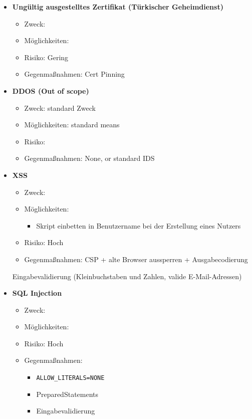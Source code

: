 \documentclass[12pt,DIV14,BCOR10mm,a4paper,twoside,parskip=half-,headsepline,headinclude,english,ngerman,bibliography=totocnumbered]{scrreprt}
\begin{document}
\begin{itemize}
  \item \textbf{Ungültig ausgestelltes Zertifikat (Türkischer Geheimdienst)}
  \begin{itemize}
  \item Zweck:
  \item Möglichkeiten:
  \item Risiko: Gering
  \item Gegenmaßnahmen: Cert Pinning
  \end{itemize}

  \item \textbf{DDOS (Out of scope)}
  \begin{itemize}
  \item Zweck: standard Zweck
  \item Möglichkeiten: standard means
  \item Risiko:
  \item Gegenmaßnahmen: None, or standard IDS
  \end{itemize}

  \item \textbf{XSS}
  \begin{itemize}
  \item Zweck:
  \item Möglichkeiten:
  \begin{itemize}
          \item Skript einbetten in Benutzername bei der Erstellung eines Nutzers
      \end{itemize}
  \item Risiko: Hoch
  \item Gegenmaßnahmen: CSP + alte Browser aussperren + Ausgabecodierung
  \end{itemize}
      Eingabevalidierung (Kleinbuchstaben und Zahlen, valide E-Mail-Adressen)

  \item \textbf{SQL Injection}
  \begin{itemize}
  \item Zweck:
  \item Möglichkeiten:
  \item Risiko: Hoch
  \item Gegenmaßnahmen:
  \begin{itemize}
    \item \texttt{ALLOW\_LITERALS=NONE}
    \item PreparedStatements
    \item Eingabevalidierung
  \end{itemize}
  \end{itemize}


\end{itemize}
\end{document}
